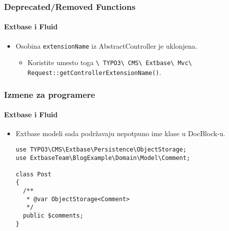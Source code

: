 \begin{frame}[fragile]
	\frametitle{Deprecated/Removed Functions}
	\framesubtitle{Extbase i Fluid}

	\begin{itemize}
		\item Osobina \texttt{extensionName} iz AbstractController je uklonjena.

			\begin{itemize}\smaller
				\item[\ding{228}] Koristite umesto toga \texttt{\textbackslash
					TYPO3\textbackslash
					CMS\textbackslash
					Extbase\textbackslash
					Mvc\textbackslash
					Request::getControllerExtensionName()}.
			\end{itemize}\normalsize

	\end{itemize}

\end{frame}


\begin{frame}[fragile]
	\frametitle{Izmene za programere}
	\framesubtitle{Extbase i Fluid}

	\lstset{basicstyle=\tiny\ttfamily}

	\begin{itemize}
		\item Extbase modeli sada podržavaju nepotpuno ime klase u DocBlock-u.

\begin{lstlisting}
use TYPO3\CMS\Extbase\Persistence\ObjectStorage;
use ExtbaseTeam\BlogExample\Domain\Model\Comment;

class Post
{
  /**
   * @var ObjectStorage<Comment>
   */
  public $comments;
}
\end{lstlisting}

	\end{itemize}

\end{frame}


